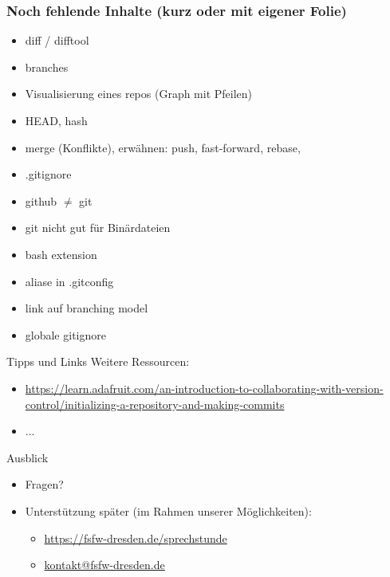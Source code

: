 \documentclass{beamer}
\begin{document}
\begin{frame}[label=gitintro50]
\frametitle{Noch fehlende Inhalte (kurz oder mit eigener Folie)}
\begin{itemize}
\item diff / difftool
\item branches \checkmark
\item Visualisierung eines repos (Graph mit Pfeilen) \checkmark
\item HEAD\checkmark , hash
\item merge (Konflikte),  erwähnen: push, fast-forward, rebase,
\item .gitignore
\item github $\neq$ git
\item git nicht gut für Binärdateien
\item bash extension
\item aliase in .gitconfig
\item link auf branching model
\item globale gitignore

\end{itemize}
\end{frame}


\begin{frame}[label=link10]{Tipps und Links}
Weitere Ressourcen:
\tiny
\begin{itemize}
 \item
\url{https://learn.adafruit.com/an-introduction-to-collaborating-with-version-control/initializing-a-repository-and-making-commits}
\item ...
\end{itemize}


\end{frame}




\begin{frame}[label=uj]{Ausblick}
\begin{itemize}
 \item Fragen?\\[10mm]
   \pause
 \item Unterstützung später {\tiny (im Rahmen unserer Möglichkeiten)}:
   \begin{itemize}
   \item \url{https://fsfw-dresden.de/sprechstunde}
   \item \url{kontakt@fsfw-dresden.de}
   \end{itemize}
\end{itemize}



\end{frame}

\end{document}
